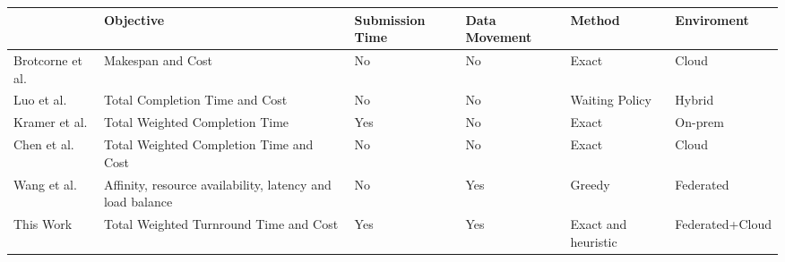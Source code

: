 \begin{table}[]
\centering
\begin{tabular}{|l|l|l|l|l|l|}
\hline
                 & Objective                                                 & Submission Time & Data Movement & Method              & Enviroment      \\ \hline
Brotcorne et al. & Makespan and Cost                                         & No           & No            & Exact               & Cloud           \\ \hline
Luo et al.       & Total Completion Time and Cost                            & No           & No            & Waiting Policy      & Hybrid          \\ \hline
Kramer et al.    & Total Weighted Completion Time                            & Yes          & No            & Exact               & On-prem         \\ \hline
Chen et al.      & Total Weighted Completion Time and Cost                   & No           & No            & Exact               & Cloud           \\ \hline
Wang et al.      & Affinity, resource availability, latency and load balance & No           & Yes           & Greedy              & Federated       \\ \hline
This Work        & Total Weighted Turnround Time and Cost                    & Yes          & Yes           & Exact and heuristic & Federated+Cloud \\ \hline
\end{tabular}
\end{table}